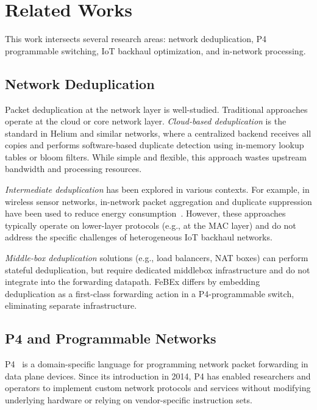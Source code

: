 \section{Related Works}
\label{sec:related}

This work intersects several research areas: network deduplication, P4 programmable switching, IoT backhaul optimization, and in-network processing.

\subsection{Network Deduplication}

Packet deduplication at the network layer is well-studied. Traditional approaches operate at the cloud or core network layer. \textit{Cloud-based deduplication} is the standard in Helium and similar networks, where a centralized backend receives all copies and performs software-based duplicate detection using in-memory lookup tables or bloom filters. While simple and flexible, this approach wastes upstream bandwidth and processing resources.

\textit{Intermediate deduplication} has been explored in various contexts. For example, in wireless sensor networks, in-network packet aggregation and duplicate suppression have been used to reduce energy consumption~\cite{tada}. However, these approaches typically operate on lower-layer protocols (e.g., at the MAC layer) and do not address the specific challenges of heterogeneous IoT backhaul networks.

\textit{Middle-box deduplication} solutions (e.g., load balancers, NAT boxes) can perform stateful deduplication, but require dedicated middlebox infrastructure and do not integrate into the forwarding datapath. FeBEx differs by embedding deduplication as a first-class forwarding action in a P4-programmable switch, eliminating separate infrastructure.

\subsection{P4 and Programmable Networks}

P4~\cite{p4} is a domain-specific language for programming network packet forwarding in data plane devices. Since its introduction in 2014, P4 has enabled researchers and operators to implement custom network protocols and services without modifying underlying hardware or relying on vendor-specific instruction sets.

